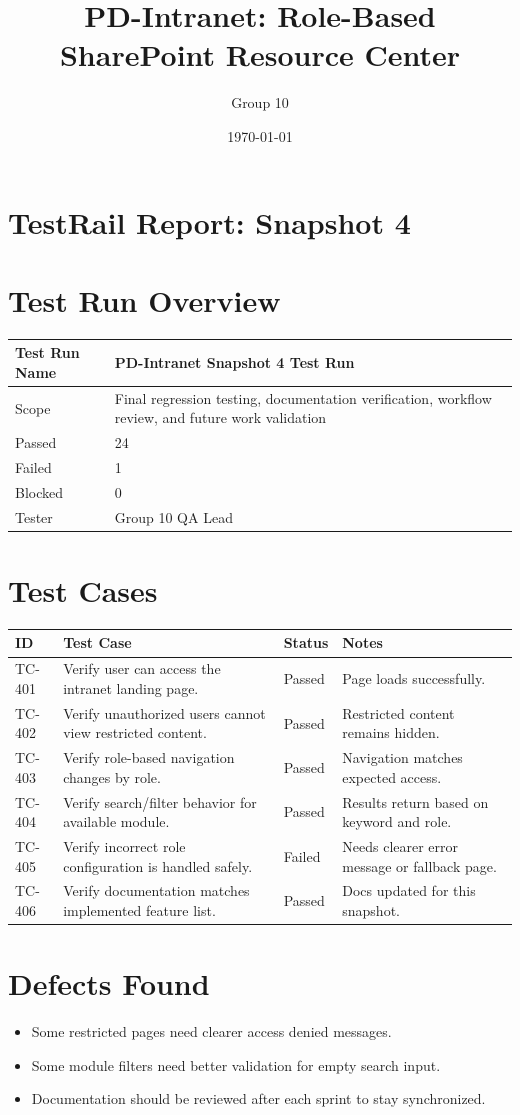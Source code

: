 \documentclass[12pt]{article}
\title{PD-Intranet: Role-Based SharePoint Resource Center}
\author{Group 10}
\date{\today}
\begin{document}
\maketitle
\tableofcontents
\newpage

\section{TestRail Report: Snapshot 4}
\section{Test Run Overview}
\begin{longtable}{|p{2in}|p{4in}|}\hline
Test Run Name & PD-Intranet Snapshot 4 Test Run \\ \hline
Scope & Final regression testing, documentation verification, workflow review, and future work validation \\ \hline
Passed & 24 \\ \hline
Failed & 1 \\ \hline
Blocked & 0 \\ \hline
Tester & Group 10 QA Lead \\ \hline
\end{longtable}

\section{Test Cases}
\begin{longtable}{|p{.8in}|p{2.2in}|p{1in}|p{2in}|}\hline
ID & Test Case & Status & Notes \\ \hline
TC-401 & Verify user can access the intranet landing page. & Passed & Page loads successfully. \\ \hline
TC-402 & Verify unauthorized users cannot view restricted content. & Passed & Restricted content remains hidden. \\ \hline
TC-403 & Verify role-based navigation changes by role. & Passed & Navigation matches expected access. \\ \hline
TC-404 & Verify search/filter behavior for available module. & Passed & Results return based on keyword and role. \\ \hline
TC-405 & Verify incorrect role configuration is handled safely. & Failed & Needs clearer error message or fallback page. \\ \hline
TC-406 & Verify documentation matches implemented feature list. & Passed & Docs updated for this snapshot. \\ \hline
\end{longtable}

\section{Defects Found}
\begin{itemize}
\item Some restricted pages need clearer access denied messages.
\item Some module filters need better validation for empty search input.
\item Documentation should be reviewed after each sprint to stay synchronized.
\end{itemize}
\end{document}
